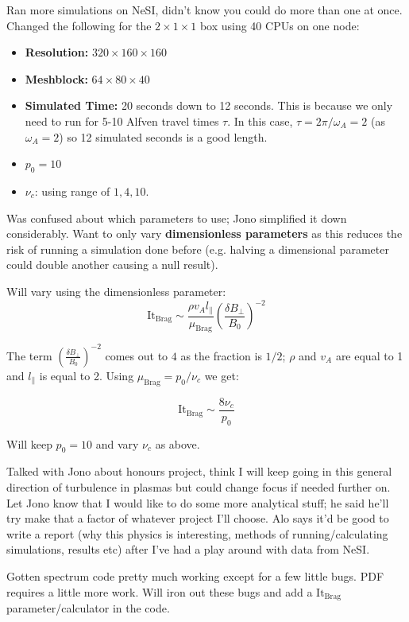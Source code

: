\documentclass[12pt,letterpaper]{article}
\begin{document}
  Ran more simulations on NeSI, didn't know you could do more than one at once. Changed the following for the $2\times 1 \times 1$ box using 40 CPUs on one node:
  \begin{itemize}
    \item \textbf{Resolution:} $320\times 160\times 160$

    \item \textbf{Meshblock:} $64\times 80 \times 40$

    \item \textbf{Simulated Time:} 20 seconds down to 12 seconds. This is because we only need to run for 5-10 Alfven travel times $\tau$. In this case, $\tau = 2\pi/\omega_A = 2$ (as $\omega_A = 2$) so 12 simulated seconds is a good length.

    \item $p_0 = 10$

    \item $\nu_c$: using range of $1, 4, 10$.
  \end{itemize}

Was confused about which parameters to use; Jono simplified it down considerably. Want to only vary \textbf{dimensionless parameters} as this reduces the risk of running a simulation done before (e.g. halving a dimensional parameter could double another causing a null result).

Will vary using the dimensionless parameter:
$$
\text{It}_\text{Brag} \sim \frac{\rho v_A l_\|}{\mu_\text{Brag}}\left(\frac{\delta B_\perp}{B_0}\right)^{-2}
$$

The term $\left(\frac{\delta B_\perp}{B_0}\right)^{-2}$ comes out to $4$ as the fraction is $1/2$; $\rho$ and $v_A$ are equal to 1 and $l_\|$ is equal to 2. Using $\mu_\text{Brag}=p_0/\nu_c$ we get:

$$
\text{It}_\text{Brag} \sim \frac{8\nu_c}{p_0}
$$

Will keep $p_0=10$ and vary $\nu_c$ as above.

Talked with Jono about honours project, think I will keep going in this general direction of turbulence in plasmas but could change focus if needed further on. Let Jono know that I would like to do some more analytical stuff; he said he'll try make that a factor of whatever project I'll choose. Alo says it'd be good to write a report (why this physics is interesting, methods of running/calculating simulations, results etc) after I've had a play around with data from NeSI.

Gotten spectrum code pretty much working except for a few little bugs. PDF requires a little more work. Will iron out these bugs and add a $\text{It}_\text{Brag}$ parameter/calculator in the code.
\end{document}
